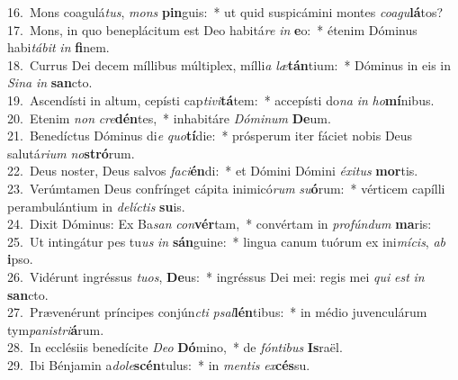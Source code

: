 {16.~}Mons coagulá\textit{tus}, \textit{mons} \textbf{pin}guis:~* ut quid suspicámini montes \textit{co}\textit{a}\textit{gu}\textbf{lá}tos?\\
{17.~}Mons, in quo beneplácitum est Deo habitá\textit{re} \textit{in} \textbf{e}o:~* étenim Dóminus habi\textit{tá}\textit{bit} \textit{in} \textbf{fi}nem.\\
{18.~}Currus Dei decem míllibus múltiplex, mílli\textit{a} \textit{læ}\textbf{tán}tium:~* Dóminus in eis in \textit{Si}\textit{na} \textit{in} \textbf{san}cto.\\
{19.~}Ascendísti in altum, cepísti cap\textit{ti}\textit{vi}\textbf{tá}tem:~* accepísti do\textit{na} \textit{in} \textit{ho}\textbf{mí}nibus.\\
{20.~}Etenim \textit{non} \textit{cre}\textbf{dén}tes,~* inhabitáre \textit{Dó}\textit{mi}\textit{num} \textbf{De}um.\\
{21.~}Benedíctus Dóminus di\textit{e} \textit{quo}\textbf{tí}die:~* prósperum iter fáciet nobis Deus salutá\textit{ri}\textit{um} \textit{no}\textbf{stró}rum.\\
{22.~}Deus noster, Deus salvos \textit{fa}\textit{ci}\textbf{én}di:~* et Dómini Dómini \textit{é}\textit{xi}\textit{tus} \textbf{mor}tis.\\
{23.~}Verúmtamen Deus confrínget cápita inimicó\textit{rum} \textit{su}\textbf{ó}rum:~* vérticem capílli perambulántium in \textit{de}\textit{lí}\textit{ctis} \textbf{su}is.\\
{24.~}Dixit Dóminus: Ex Ba\textit{san} \textit{con}\textbf{vér}tam,~* convértam in \textit{pro}\textit{fún}\textit{dum} \textbf{ma}ris:\\
{25.~}Ut intingátur pes tu\textit{us} \textit{in} \textbf{sán}guine:~* lingua canum tuórum ex ini\textit{mí}\textit{cis}, \textit{ab} \textbf{i}pso.\\
{26.~}Vidérunt ingréssus \textit{tu}\textit{os}, \textbf{De}us:~* ingréssus Dei mei: regis mei \textit{qui} \textit{est} \textit{in} \textbf{san}cto.\\
{27.~}Prævenérunt príncipes conjún\textit{cti} \textit{psal}\textbf{lén}tibus:~* in médio juvenculárum tym\textit{pa}\textit{ni}\textit{stri}\textbf{á}rum.\\
{28.~}In ecclésiis benedícite \textit{De}\textit{o} \textbf{Dó}mino,~* de \textit{fón}\textit{ti}\textit{bus} \textbf{Is}raël.\\
{29.~}Ibi Bénjamin a\textit{do}\textit{le}\textbf{scén}tulus:~* in \textit{men}\textit{tis} \textit{ex}\textbf{cés}su.\\
